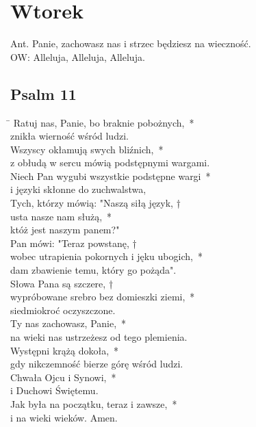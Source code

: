 \section*{Wtorek}
Ant. Panie, zachowasz nas i strzec będziesz na wieczność.\\
OW: Alleluja, Alleluja, Alleluja.
\subsection*{Psalm 11}
\begin{tabbing}
\hspace{4mm} \= \>\kill
Ratuj nas, Panie, bo braknie pobożnych,~*\\
znikła wierność wśród ludzi.\\
\>Wszyscy okłamują swych bliźnich,~*\\
\>z obłudą w sercu mówią podstępnymi wargami.\\
Niech Pan wygubi wszystkie podstępne wargi~*\\
i języki skłonne do zuchwalstwa,\\
\>Tych, którzy mówią: "Naszą siłą język, †\\
\>usta nasze nam służą,~*\\
\>któż jest naszym panem?"\\
Pan mówi: "Teraz powstanę, †\\
wobec utrapienia pokornych i jęku ubogich,~*\\
dam zbawienie temu, który go pożąda".\\
\>Słowa Pana są szczere, †\\
\>wypróbowane srebro bez domieszki ziemi,~*\\
\>siedmiokroć oczyszczone.\\
Ty nas zachowasz, Panie,~*\\
na wieki nas ustrzeżesz od tego plemienia.\\
\>Występni krążą dokoła,~*\\
\>gdy nikczemność bierze górę wśród ludzi.\\
Chwała Ojcu i Synowi,~*\\
i Duchowi Świętemu.\\
\>Jak była na początku, teraz i zawsze,~*\\
\>i na wieki wieków. Amen.\\
\end{tabbing}

